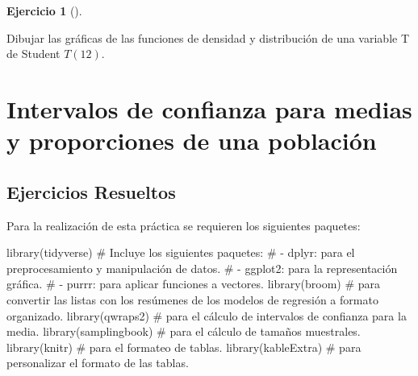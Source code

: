 \documentclass[
  a4paper,
]{scrreport}
\newenvironment{Shaded}{\begin{snugshade}}{\end{snugshade}}
\newcommand{\CommentTok}[1]{\textcolor[rgb]{0.37,0.37,0.37}{#1}}
\newcommand{\FunctionTok}[1]{\textcolor[rgb]{0.28,0.35,0.67}{#1}}
\newcommand{\NormalTok}[1]{\textcolor[rgb]{0.00,0.23,0.31}{#1}}
\theoremstyle{definition}
\newtheorem{exercise}{Ejercicio}[chapter]
\theoremstyle{remark}
\begin{document}
\begin{exercise}[]\protect\hypertarget{exr-distribuciones-probabilidad-11}{}\label{exr-distribuciones-probabilidad-11}

Dibujar las gráficas de las funciones de densidad y distribución de una
variable T de Student \(T(12)\).

\end{exercise}


\chapter{Intervalos de confianza para medias y proporciones de una
población}\label{intervalos-de-confianza-para-medias-y-proporciones-de-una-poblaciuxf3n}

\section{Ejercicios Resueltos}\label{ejercicios-resueltos-5}

Para la realización de esta práctica se requieren los siguientes
paquetes:

\begin{Shaded}
\begin{Highlighting}[]
\FunctionTok{library}\NormalTok{(tidyverse)}
\CommentTok{\# Incluye los siguientes paquetes:}
\CommentTok{\# {-} dplyr: para el preprocesamiento y manipulación de datos.}
\CommentTok{\# {-} ggplot2: para la representación gráfica.}
\CommentTok{\# {-} purrr: para aplicar funciones a vectores.}
\FunctionTok{library}\NormalTok{(broom) }\CommentTok{\# para convertir las listas con los resúmenes de los modelos de regresión a formato organizado.}
\FunctionTok{library}\NormalTok{(qwraps2) }\CommentTok{\# para el cálculo de intervalos de confianza para la media.}
\FunctionTok{library}\NormalTok{(samplingbook) }\CommentTok{\# para el cálculo de tamaños muestrales.}
\FunctionTok{library}\NormalTok{(knitr) }\CommentTok{\# para el formateo de tablas.}
\FunctionTok{library}\NormalTok{(kableExtra) }\CommentTok{\# para personalizar el formato de las tablas.}
\end{Highlighting}
\end{Shaded}
\end{document}
